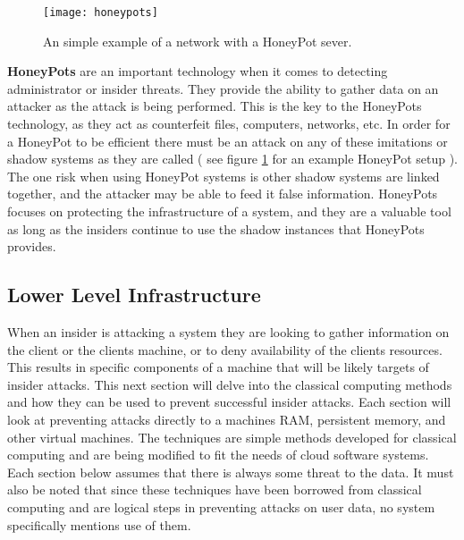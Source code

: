 \label{hlHoneyPots}

\begin{figure}
  \centering
    \texttt{[image: honeypots]}
  \caption{An simple example of a network with a HoneyPot sever.}
  \label{honeypot_image}
\end{figure}

\textbf{HoneyPots} are an important technology when it comes to detecting administrator or insider threats. They provide the ability to gather data on an attacker as the attack is being performed. This is the key to the HoneyPots technology, as they act as counterfeit files, computers, networks, etc. In order for a HoneyPot to be efficient there must be an attack on any of these imitations or shadow systems as they are called ( see figure \ref{honeypot_image} for an example HoneyPot setup ). \cite{spitzner} The one risk when using HoneyPot systems is other shadow systems are linked together, and the attacker may be able to feed it false information. HoneyPots focuses on protecting the infrastructure of a system, and they are a valuable tool as long as the insiders continue to use the shadow instances that HoneyPots provides. \cite{spitzner}

\subsection{Lower Level Infrastructure}
\label{llInfrastructure}

When an insider is attacking a system they are looking to gather information on the client or the clients machine, or to deny availability of the clients resources. \cite{kandias} This results in specific components of a machine that will be likely targets of insider attacks. This next section will delve into the classical computing methods and how they can be used to prevent successful insider attacks. Each section will look at preventing attacks directly to a machines RAM, persistent memory, and other virtual machines. The techniques are simple methods developed for classical computing and are being modified to fit the needs of cloud software systems. Each section below assumes that there is always some threat to the data. It must also be noted that since these techniques have been borrowed from classical computing and are logical steps in preventing attacks on user data, no system specifically mentions use of them. \cite{szefer}

\label{llEncryption}

